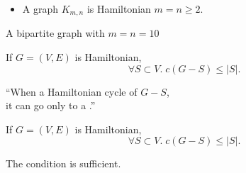 \begin{frame}{}
  \begin{exampleblock}{}
    \begin{itemize}
      \item A  graph $K_{m, n}$ is Hamiltonian
         $m = n \ge 2$.
    \end{itemize}
  \end{exampleblock}

  \pause
  \vspace{0.50cm}

  \begin{center}
    A  bipartite graph with $m = n = 10$
  \end{center}
\end{frame}

\begin{frame}{}
  \begin{theorem}{}
    If $G = (V, E)$ is Hamiltonian,
    \[
      \forall S \subset V.\; c(G - S) \le |S|.
    \]
  \end{theorem}

  \pause
  \vspace{0.50cm}

  \pause
  \begin{center}
    ``When a Hamiltonian cycle  of $G - S$, \\[3pt]
    it can go only to a .''
  \end{center}
\end{frame}

\begin{frame}{}
  \begin{theorem}{}
    If $G = (V, E)$ is Hamiltonian,
    \[
      \forall S \subset V.\; c(G - S) \le |S|.
    \]
  \end{theorem}

  \pause
  \vspace{0.30cm}
  \begin{center}
    The condition is  sufficient.

    \pause

    \pause
    \begin{center}
    \end{center}
  \end{center}
\end{frame}

